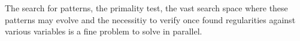 The search for patterns, the primality test, the vast search space where these patterns may evolve and the necessitiy to verify once found regularities against various variables is a fine problem to solve in parallel.
 


